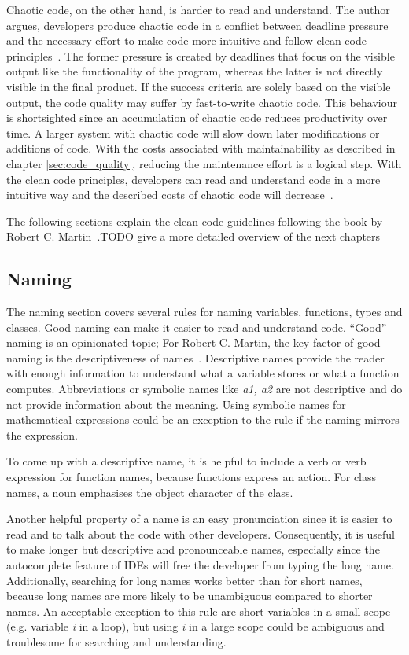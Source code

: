 Chaotic code, on the other hand, is harder to read and understand. The author argues, developers produce chaotic code in a conflict between deadline pressure and the necessary effort to make code more intuitive and follow clean code principles~\cite{martin_clean_2009}. The former pressure is created by deadlines that focus on the visible output like the functionality of the program, whereas the latter is not directly visible in the final product. If the success criteria are solely based on the visible output, the code quality may suffer by fast-to-write chaotic code. This behaviour is shortsighted since an accumulation of chaotic code reduces productivity over time. A larger system with chaotic code will slow down later modifications or additions of code. With the costs associated with maintainability as described in chapter \ref{sec:code_quality}, reducing the maintenance effort is a logical step. With the clean code principles, developers can read and understand code in a more intuitive way and the described costs of chaotic code will decrease~\cite{martin_clean_2009}.



The following sections explain the clean code guidelines following the book by Robert C. Martin~\cite{martin_clean_2009}.TODO give a more detailed overview of the next chapters

\subsection{Naming}\label{sec:naming}
The naming section covers several rules for naming variables, functions, types and classes.
Good naming can make it easier to read and understand code. \enquote{Good} naming is an opinionated topic; For Robert C. Martin, the key factor of good naming is the descriptiveness of names~\cite{martin_clean_2009}. Descriptive names provide the reader with enough information to understand what a variable stores or what a function computes. Abbreviations or symbolic names like \textit{a1, a2} are not descriptive and do not provide information about the meaning. Using symbolic names for mathematical expressions could be an exception to the rule if the naming mirrors the expression.

To come up with a descriptive name, it is helpful to include a verb or verb expression for function names, because functions express an action. For class names, a noun emphasises the object character of the class.

Another helpful property of a name is an easy pronunciation since it is easier to read and to talk about the code with other developers. Consequently, it is useful to make longer but descriptive and pronounceable names, especially since the autocomplete feature of IDEs will free the developer from typing the long name. Additionally, searching for long names works better than for short names, because long names are more likely to be unambiguous compared to shorter names. An acceptable exception to this rule are short variables in a small scope (e.g. variable \textit{i} in a loop), but using \textit{i} in a large scope could be ambiguous and troublesome for searching and understanding.


